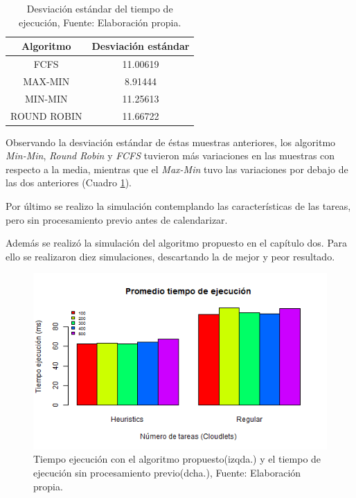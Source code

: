 \documentclass[jou,apacite]{apa6}
\begin{document}
\renewcommand\thetable{\arabic{table}}
\begin{table}[h!]
	\centering
	\begin{tabular}{@{}cc@{}}
		\toprule
		{\bf Algoritmo} & \multicolumn{1}{l}{{\bf Desviaci\'on est\'andar}} \\ \midrule
		FCFS & 11.00619 \\
		MAX-MIN & 8.91444 \\
		MIN-MIN & 11.25613 \\ 
		ROUND ROBIN & 11.66722 \\ \bottomrule
		
	\end{tabular}
	\caption{Desviaci\'on est\'andar del tiempo de ejecuci\'on, Fuente: Elaboraci\'on propia.}
	\label{tiempotabla}
\end{table}

Observando la desviaci\'on est\'andar de \'estas muestras anteriores, los algoritmo \textit{Min-Min}, \textit{Round Robin} y \textit{FCFS} tuvieron m\'as variaciones en las muestras con respecto a la media, mientras que el \textit{Max-Min} tuvo las variaciones por debajo de las dos anteriores (Cuadro \ref{tiempotabla}).


Por último se realizo la simulación contemplando las características de las tareas, pero sin procesamiento previo antes de calendarizar. 

Además se realizó la simulación del algoritmo propuesto en el capítulo dos. Para ello se realizaron diez simulaciones, descartando la de mejor y peor resultado.

\renewcommand\thefigure{\arabic{figure}}
\begin{figure}[h!] 
	\centering
	\includegraphics[scale=0.5]{media/tiempoFinal}
	\caption{Tiempo ejecuci\'on con el algoritmo propuesto(izqda.) y el tiempo de ejecución sin procesamiento previo(dcha.), Fuente: Elaboraci\'on propia.}
	\label{fig:timeF}
\end{figure}
\end{document}
